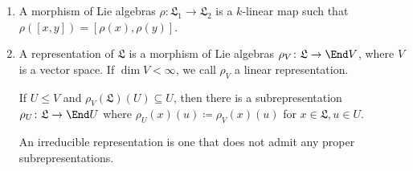 \begin{enumerate}[label=(\alph*)]
	\item A morphism of Lie algebras $\rho\colon \mathfrak{L}_1 \to \mathfrak{L}_2$ is
		a $k$-linear map such that $\rho([x, y]) = [\rho(x), \rho(y)]$.
	\item A representation of $\mathfrak{L}$ is a morphism of Lie algebras
		$\rho_V\colon \mathfrak{L}\to \End V$, where $V$ is a vector space.
		If $\dim V<\infty$, we call $\rho_V$ a linear representation.

		If $U\leq V$ and  $\rho_V(\mathfrak{L})(U) \subseteq U$, then there
		is a subrepresentation $\rho_U\colon \mathfrak{L}\to\End U$ where
		$\rho_U(x)(u) \coloneqq \rho_V(x)(u)$ for $x \in \mathfrak{L}, u \in U$.

		An irreducible representation is one that does not admit any proper
		subrepresentations.
\end{enumerate}
